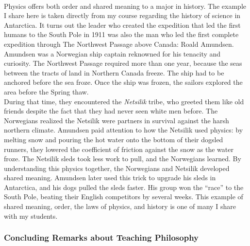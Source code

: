 \documentclass[../../../main.tex]{subfiles}
\begin{document}
\\
\vspace{0.15cm}
Physics offers both order and shared meaning to a major in history.  The example I share here is taken directly from my course regarding the history of science in Antarctica.  It turns out the leader who created the expedition that led the first humans to the South Pole in 1911 was also the man who led the first complete expedition through The Northwest Passage above Canada: Roald Amundsen.  Amundsen was a Norwegian ship captain reknowned for his tenacity and curiosity.  The Northwest Passage required more than one year, because the seas between the tracts of land in Northern Canada freeze.  The ship had to be anchored before the sea froze.  Once the ship was frozen, the sailors explored the area before the Spring thaw.
\\
\vspace{0.15cm}
During that time, they encountered the \textit{Netsilik} tribe, who greeted them like old friends despite the fact that they had never seen white men before.  The Norwegians realized the Netsilik were partners in survival against the harsh northern climate. Amundsen paid attention to how the Netsilik used physics: by melting snow and pouring the hot water onto the bottom of their dogsled runners, they lowered the coefficient of friction against the snow as the water froze.  The Netsilik sleds took less work to pull, and the Norwegians learned.  By understanding this physics together, the Norwegians and Netsilik developed shared meaning.  Amundsen later used this trick to upgrade his sleds in Antarctica, and his dogs pulled the sleds faster.  His group won the ``race'' to the South Pole, beating their English competitors by several weeks.  This example of shared meaning, order, the laws of physics, and history is one of many I share with my students.

\subsubsection{Concluding Remarks about Teaching Philosophy}
\end{document}
